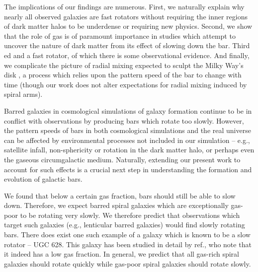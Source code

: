 \documentclass{natureprintstyle}
\begin{document}
The implications of our findings are numerous. First, we naturally explain why
nearly all observed galaxies are fast rotators without requiring the inner
regions of dark matter halos to be underdense\cite{1998ApJ...493L...5D,
2000ApJ...543..704D} or requiring new physics.\cite{2021MNRAS.503.2833R,
2021MNRAS.508..926R} Second, we show that the role of gas is of paramount
importance in studies which attempt to uncover the nature of dark matter from
its effect of slowing down the bar.\cite{2021MNRAS.500.4710C,
2021MNRAS.505.2412C} Third
ed and a fast rotator, of which there is some
observational evidence.\cite{2019MNRAS.490.4740B} And finally, we complicate
the picture of radial mixing expected to sculpt the Milky Way's disk
\cite{2012MNRAS.420..913B, 2015ApJ...808..132H}, a process which relies upon
the pattern speed of the bar to change with time (though our work does not
alter expectations for radial mixing induced by spiral
arms\cite{2002MNRAS.336..785S}).

Barred galaxies in cosmological simulations of galaxy formation continue to be
in conflict with observations by producing bars which rotate too
slowly.\cite{2017MNRAS.469.1054A, 2019MNRAS.483.2721P, 2021AA...650L..16F}
However, the pattern speeds of bars in both cosmological simulations and the
real universe can be affected by environmental processes not included in our
simulation -- e.g., satellite infall\cite{2011Natur.477..301P},
non-sphericity\cite{2013MNRAS.429.1949A} or rotation\cite{2013MNRAS.434.1287S,
2014ApJ...783L..18L, 2018MNRAS.476.1331C, 2019MNRAS.488.5788C} in the dark
matter halo, or perhaps even the gaseous circumgalactic medium. Naturally,
extending our present work to account for such effects is a crucial next step
in understanding the formation and evolution of galactic bars.

We found that below a certain gas fraction, bars should still be able to slow
down. Therefore, we expect barred spiral galaxies which are exceptionally
gas-poor to be rotating very slowly. We therefore predict that observations
which target such galaxies (e.g., lenticular barred
galaxies\cite{2009ARAA..47..159B}) would find slowly rotating bars. There does
exist one such example of a galaxy which is known to be a slow rotator -- UGC
628.\cite{2009AA...499L..25C} This galaxy has been studied in detail by
ref.\cite{2016MNRAS.463.1751C}, who note that it indeed has a low gas
fraction. In general, we predict that all gas-rich spiral galaxies should
rotate quickly while gas-poor spiral galaxies should rotate slowly.
\end{document}
